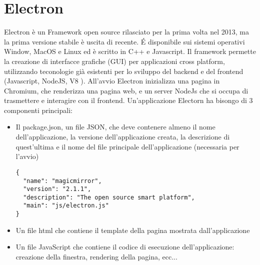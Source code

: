 \section{Electron}
Electron è un Framework open source rilasciato per la prima volta nel 2013, ma la prima versione
stabile è uscita di recente. \'E disponibile sui sistemi operativi Window, MacOS e Linux ed è scritto
in C++ e Javascript. Il framework permette la creazione di interfacce grafiche (GUI) per
applicazioni cross platform, utilizzando teconologie già esistenti per lo sviluppo del backend e del frontend
(Javascript, NodeJS, V8 \cite{V8}).
All'avvio Electron inizializza una pagina in Chromium, che renderizza una pagina web, e un server
NodeJs che si occupa di trasmettere e interagire con il frontend.
Un'applicazione Electorn ha bisongo di 3 componenti principali:
\begin{itemize}
\item Il package.json, un file JSON, che deve contenere almeno il nome dell'applicazione,
la versione dell'applicazione creata, la descrizione di quest'ultima e il
 nome del file principale dell'applicazione (necessaria per l'avvio)
\begin{lstlisting}
{
  "name": "magicmirror",
  "version": "2.1.1",
  "description": "The open source smart platform",
  "main": "js/electron.js"
}
\end{lstlisting}
\item Un file html che contiene il template della pagina mostrata dall'applicazione
\item Un file JavaScript che contiene il codice di esecuzione dell'applicazione: creazione della finestra,
rendering della pagina, ecc...
\end{itemize}

